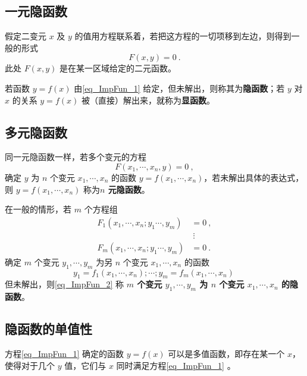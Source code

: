 
\subsection{一元隐函数}
假定二变元 $x$ 及 $y$ 的值用方程联系着，若把这方程的一切项移到左边，则得到一般的形式
\begin{equation}\label{eq_ImpFun_1}
F(x,y)=0~.
\end{equation}
此处 $F(x,y)$ 是在某一区域给定的二元函数。

若函数 $y=f(x)$ 由\autoref{eq_ImpFun_1} 给定，但未解出，则称其为\textbf{隐函数}；若 $y$ 对 $x$ 的关系 $y=f(x)$ 被（直接）解出来，就称为\textbf{显函数}。
\subsection{多元隐函数}
同一元隐函数一样，若多个变元的方程
\begin{equation}\label{eq_ImpFun_5}
F(x_1,\cdots,x_n,y)=0~,
\end{equation}
确定 $y$ 为 $n$ 个变元 $x_1,\cdots,x_n$ 的函数 $y=f(x_1,\cdots,x_n)$，若未解出具体的表达式，则 $y=f(x_1,\cdots,x_n)$ 称为\textbf{$n$ 元隐函数}。 

在一般的情形，若 $m$ 个方程组
\begin{equation}\label{eq_ImpFun_6}
\begin{aligned}
F_1(x_1,\cdots,x_n;y_1\cdots,y_m)&=0~,\\
&\ \vdots\\
F_m(x_1,\cdots,x_n;y_1\cdots,y_m)&=0~.
\end{aligned}
\end{equation}
确定 $m$ 个变元 $y_1,\cdots,y_m$ 为另 $n$ 个变元 $x_1,\cdots,x_n$ 的函数
\begin{equation}\label{eq_ImpFun_2}
y_1=f_1(x_1,\cdots,x_n);\cdots;y_m=f_m(x_1,\cdots,x_n)~
\end{equation}
但未解出，则\autoref{eq_ImpFun_2} 称\textbf{ $m$ 个变元 $y_1,\cdots,y_m$ 为 $n$ 个变元 $x_1,\cdots,x_n$ 的隐函数}。 
\subsection{隐函数的单值性}
方程\autoref{eq_ImpFun_1} 确定的函数 $y=f(x)$ 可以是多值函数，即存在某一个 $x$，使得对于几个 $y$ 值，它们与 $x$ 同时满足方程\autoref{eq_ImpFun_1} 。

